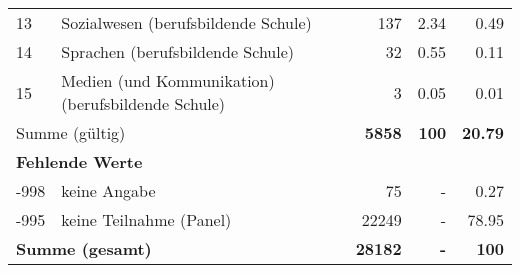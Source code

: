 \begin{longtable}{lXrrr}
     13 &
     \multicolumn{1}{X}{ Sozialwesen (berufsbildende Schule)   } &


       \num{137} &
       \num[round-mode=places,round-precision=2]{2.34} &
         \num[round-mode=places,round-precision=2]{0.49} \\

     14 &
     \multicolumn{1}{X}{ Sprachen (berufsbildende Schule)   } &


       \num{32} &
       \num[round-mode=places,round-precision=2]{0.55} &
         \num[round-mode=places,round-precision=2]{0.11} \\

     15 &
     \multicolumn{1}{X}{ Medien (und Kommunikation) (berufsbildende Schule)   } &


       \num{3} &
       \num[round-mode=places,round-precision=2]{0.05} &
         \num[round-mode=places,round-precision=2]{0.01} \\
     \midrule
     \multicolumn{2}{l}{Summe (gültig)} &
       \textbf{\num{5858}} &
     \textbf{100} &
       \textbf{\num[round-mode=places,round-precision=2]{20.79}} \\
     \multicolumn{5}{l}{\textbf{Fehlende Werte}}\\
       -998 &
       keine Angabe &
         \num{75} &
        - &
         \num[round-mode=places,round-precision=2]{0.27} \\
       -995 &
       keine Teilnahme (Panel) &
         \num{22249} &
        - &
         \num[round-mode=places,round-precision=2]{78.95} \\
     \midrule
     \multicolumn{2}{l}{\textbf{Summe (gesamt)}} &
          \textbf{\num{28182}} &
        \textbf{-} &
        \textbf{100} \\
     \bottomrule
     \end{longtable}
     
